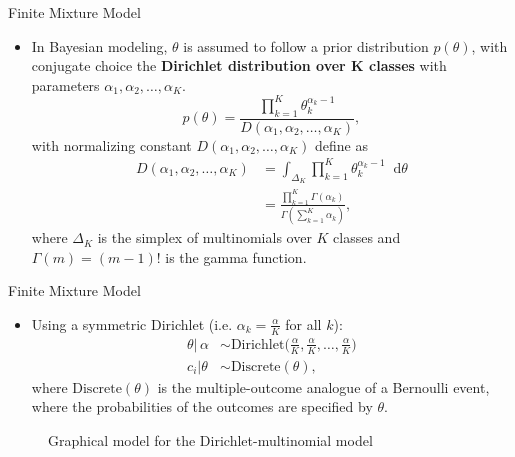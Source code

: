 \documentclass[aspectratio=169,xcolor=dvipsnames]{beamer}
\newcommand*\diff{\mathop{}\!\mathrm{d}}
\newcommand{\aOverK}{\frac{\alpha}{K}}
\begin{document}
\begin{frame}{Finite Mixture Model}
\setlength{\leftmargini}{0.2cm}
\begin{itemize}
\item In Bayesian modeling, $\theta$ is assumed to follow a prior distribution $p(\theta)$, with conjugate choice the \textbf{Dirichlet distribution over K classes} with parameters $\alpha_1,\alpha_2,\dots,\alpha_K$.
\begin{equation*}
    p(\theta) = \frac{\prod_{k=1}^{K}\theta^{\alpha_k-1}_{k}}{D(\alpha_1,\alpha_2,\dots,\alpha_K)},
\end{equation*}
with normalizing constant $D(\alpha_1,\alpha_2,\dots,\alpha_K)$ define as
\begin{align*}
    D(\alpha_1,\alpha_2,\dots,\alpha_K) &= \int_{\Delta_{K}} \prod_{k=1}^{K}\theta^{\alpha_k-1}_{k} \diff \theta \\ &= \frac{\prod_{k=1}^{K} \Gamma(\alpha_{k})}{\Gamma(\sum_{k=1}^{K}\alpha_{k})},
\end{align*}
where $\Delta_K$ is the simplex of multinomials over $K$ classes  and $\Gamma(m) = (m - 1)!$ is the gamma function.
\end{itemize}
\end{frame}
\begin{frame}{Finite Mixture Model}
\setlength{\leftmargini}{0.2cm}
\begin{itemize}
\item Using a symmetric Dirichlet (i.e. $\alpha_k = \aOverK$ for all $k$):
\begin{align*}
    \theta | \, \alpha &\sim \text{Dirichlet}\Big(\aOverK, \aOverK, \dots, \aOverK\Big) \\ c_i | \theta & \sim \text{Discrete}(\theta),
\end{align*}
where $\text{Discrete}(\theta)$ is the multiple-outcome analogue of a Bernoulli event, where the probabilities of the outcomes are specified by $\theta$.
\end{itemize}
\vspace{1pt}
\begin{figure}
\begin{center} 
\caption{Graphical model for the Dirichlet-multinomial model}
\label{fig:dirichlet_mult}
\end{center}
\end{figure}
\end{frame}
\end{document}
